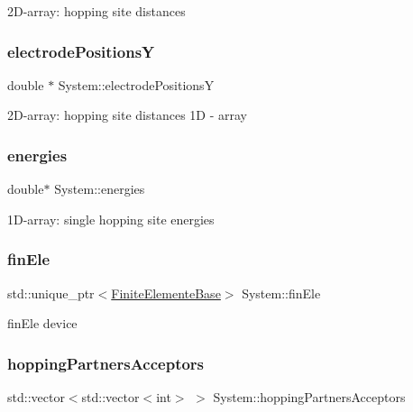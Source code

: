 2\+D-\/array\+: hopping site distances \mbox{\label{classSystem_a19886677a5c1f1989fee3a9d1d4b4c80}} 
\subsubsection{\texorpdfstring{electrode\+PositionsY}{electrodePositionsY}}
{\footnotesize\ttfamily double $\ast$ System\+::electrode\+PositionsY\hspace{0.3cm}{\ttfamily [private]}}

2\+D-\/array\+: hopping site distances 1D -\/ array \mbox{\label{classSystem_aee5f3f70dcfa30875997d09e2a077dce}} 
\subsubsection{\texorpdfstring{energies}{energies}}
{\footnotesize\ttfamily double$\ast$ System\+::energies\hspace{0.3cm}{\ttfamily [private]}}

1\+D-\/array\+: single hopping site energies \mbox{\label{classSystem_a586a959bbcb019f061535e63d7a96852}} 
\subsubsection{\texorpdfstring{fin\+Ele}{finEle}}
{\footnotesize\ttfamily std\+::unique\+\_\+ptr$<$\hyperlink{classFiniteElementeBase}{Finite\+Elemente\+Base}$>$ System\+::fin\+Ele\hspace{0.3cm}{\ttfamily [private]}}

fin\+Ele device \mbox{\label{classSystem_ae9ca6aa54468effc1fae57c2adc6c578}} 
\subsubsection{\texorpdfstring{hopping\+Partners\+Acceptors}{hoppingPartnersAcceptors}}
{\footnotesize\ttfamily std\+::vector$<$std\+::vector$<$int$>$ $>$ System\+::hopping\+Partners\+Acceptors\hspace{0.3cm}{\ttfamily [private]}}

